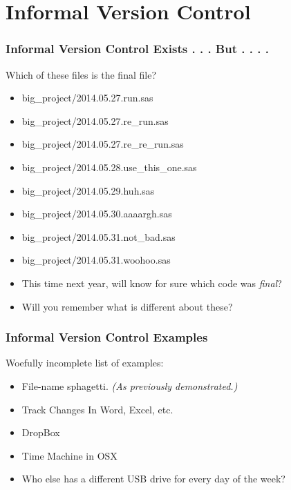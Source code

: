 \documentclass{beamer}
\begin{document}
\section{Informal Version Control} %

\begin{frame}
  \frametitle{Informal Version Control Exists . . . But . . . .}
  {\large Which of these files is the final file?}
  \bigskip
  \begin{itemize}
  \item big\_project/2014.05.27.run.sas
  \item big\_project/2014.05.27.re\_run.sas
  \item big\_project/2014.05.27.re\_re\_run.sas
  \item big\_project/2014.05.28.use\_this\_one.sas
  \item big\_project/2014.05.29.huh.sas
  \item big\_project/2014.05.30.aaaargh.sas
  \item big\_project/2014.05.31.not\_bad.sas
  \item big\_project/2014.05.31.woohoo.sas
  \end{itemize}
  \pause
  \bigskip
  \begin{itemize}
  \item This time next year, will know for sure which code was
    \emph{final}?
  \item Will you remember what is different about these?
  \end{itemize}
  
\end{frame}

\begin{frame}
  \frametitle{Informal Version Control Examples}
  {\large Woefully incomplete list of examples:}
  \bigskip
  \begin{itemize}
  \item File-name sphagetti. \emph{(As previously demonstrated.)}
  \item Track Changes In Word, Excel, etc.
  \item DropBox
  \item Time Machine in OSX
  \item Who else has a different USB drive for every day of the week?
  \end{itemize} 
\end{frame}
\end{document}
